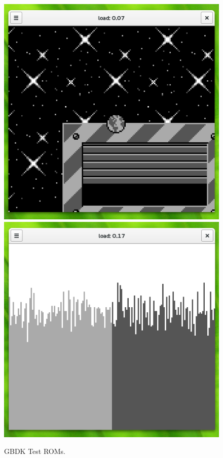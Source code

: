 \documentclass[a4paper]{scrartcl}
\begin{document}
\begin{figure}[H]
\endminipage\hspace{0.7cm}
  \includegraphics[width=\linewidth]{img/space}\vspace{0.7cm}
  \includegraphics[width=\linewidth]{img/rand}
\endminipage
\caption{GBDK Test ROMs.}
\end{figure}
\end{document}
